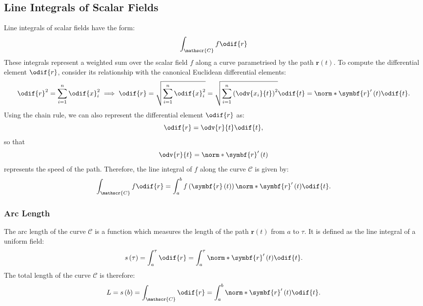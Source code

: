 \documentclass{article}
\begin{document}
\subsection{Line Integrals of Scalar Fields}
Line integrals of scalar fields have the form:
\begin{equation*}
    \int_{\mathscr{C}} f \odif{r}
\end{equation*}
These integrals represent a weighted sum over the scalar field \(f\)
along a curve parametrised by the path \(\symbf{r}\left( t \right)\).
To compute the differential element \(\odif{r}\), consider its
relationship with the canonical Euclidean differential elements:
\begin{equation*}
    \odif{r}^2 = \sum_{i = 1}^n \odif{x}_i^2 \implies \odif{r} = \sqrt{\sum_{i = 1}^n \odif{x}_i^2} = \sqrt{\sum_{i = 1}^n \left( \odv{x_i}{t} \right)^2} \odif{t} = \norm*{\symbf{r}'\left( t \right)} \odif{t}.
\end{equation*}
Using the chain rule, we can also represent the differential element
\(\odif{r}\) as:
\begin{equation*}
    \odif{r} = \odv{r}{t} \odif{t},
\end{equation*}
so that
\begin{equation*}
    \odv{r}{t} = \norm*{\symbf{r}'\left( t \right)}
\end{equation*}
represents the speed of the path. Therefore, the line integral of \(f\)
along the curve \(\mathscr{C}\) is given by:
\begin{equation*}
    \int_{\mathscr{C}} f \odif{r} = \int_a^b f\left( \symbf{r}\left( t \right) \right) \norm*{\symbf{r}'\left( t \right)} \odif{t}.
\end{equation*}
\subsubsection{Arc Length}
The arc length of the curve \(\mathscr{C}\) is a function which
measures the length of the path \(\symbf{r}\left( t \right)\) from
\(a\) to \(\tau\). It is defined as the line integral of a uniform
field:
\begin{equation*}
    s\left( \tau \right) = \int_a^\tau \odif{r} = \int_a^\tau \norm*{\symbf{r}'\left( t \right)} \odif{t}.
\end{equation*}
The total length of the curve \(\mathscr{C}\) is therefore:
\begin{equation*}
    L = s\left( b \right) = \int_{\mathscr{C}} \odif{r} = \int_a^b \norm*{\symbf{r}'\left( t \right)} \odif{t}.
\end{equation*}
\end{document}
